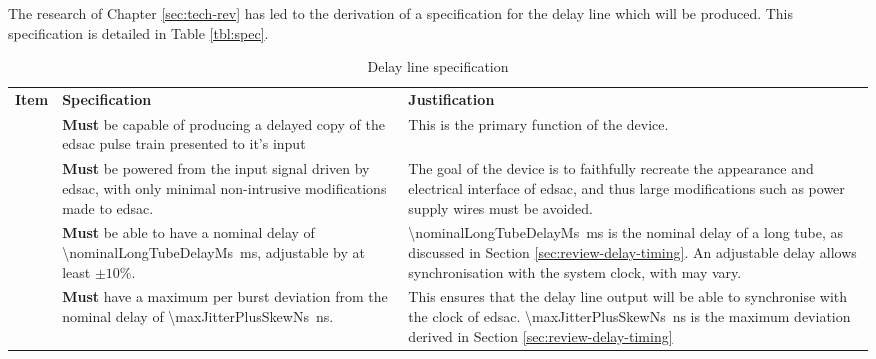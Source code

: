The research of Chapter \ref{sec:tech-rev} has led to the derivation of a specification for the delay line which will be produced. This specification is detailed in Table \ref{tbl:spec}.

\begin{longtable}{r  >{\raggedright}p{}  >{\raggedright}p{} }

	\caption{Delay line specification}\label{tbl:spec}\newcounter{specNo}\tabularnewline

	\toprule

	\bfseries Item & \bfseries Specification & \bfseries Justification \tabularnewline

	\midrule

	\endhead %

	\bottomrule

	\endfoot

	
	{specNo}\thespecNo\label{itm:spec-delay} & \textbf{Must} be capable of producing a delayed copy of the \gls{edsac} pulse train presented to it's input & This is the primary function of the device. \tabularnewline
	
	{specNo}\thespecNo\label{itm:spec-power} & \textbf{Must} be powered from the input signal driven by \gls{edsac}, with only minimal non-intrusive modifications made to \gls{edsac}. & The goal of the device is to faithfully recreate the appearance and electrical interface of \gls{edsac}, and thus large modifications such as power supply wires must be avoided. \tabularnewline
	
	{specNo}\thespecNo\label{itm:spec-output-delay} & \textbf{Must} be able to have a nominal delay of \SI{\nominalLongTubeDelayMs}{\milli\second}, adjustable by at least $\pm 10\%$. & \SI{\nominalLongTubeDelayMs}{\milli\second} is the nominal delay of a long tube, as discussed in Section \ref{sec:review-delay-timing}. An adjustable delay allows synchronisation with the system clock, with may vary. \tabularnewline
	
	
	{specNo}\thespecNo\label{itm:spec-skew-jitter} & \textbf{Must} have a maximum per burst deviation from the nominal delay of \SI{\maxJitterPlusSkewNs}{\nano\second}. & This ensures that the delay line output will be able to synchronise with the clock of \gls{edsac}. \SI{\maxJitterPlusSkewNs}{\nano\second} is the maximum deviation derived in Section \ref{sec:review-delay-timing} \tabularnewline
	

\end{longtable}

